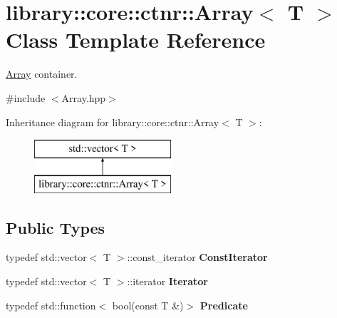\hypertarget{classlibrary_1_1core_1_1ctnr_1_1_array}{}\section{library\+:\+:core\+:\+:ctnr\+:\+:Array$<$ T $>$ Class Template Reference}
\label{classlibrary_1_1core_1_1ctnr_1_1_array}


\hyperlink{classlibrary_1_1core_1_1ctnr_1_1_array}{Array} container.  




{\ttfamily \#include $<$Array.\+hpp$>$}

Inheritance diagram for library\+:\+:core\+:\+:ctnr\+:\+:Array$<$ T $>$\+:\begin{figure}[H]
\begin{center}
\leavevmode
\includegraphics[height=2.000000cm]{classlibrary_1_1core_1_1ctnr_1_1_array}
\end{center}
\end{figure}
\subsection*{Public Types}
\begin{DoxyCompactItemize}
\item 
\mbox{\label{classlibrary_1_1core_1_1ctnr_1_1_array_ac26454f2a2ad4013873386a70aa25fc4}} 
typedef std\+::vector$<$ T $>$\+::const\+\_\+iterator {\bfseries Const\+Iterator}
\item 
\mbox{\label{classlibrary_1_1core_1_1ctnr_1_1_array_a2364a34e7bc76d3661c3d89c4729a0e4}} 
typedef std\+::vector$<$ T $>$\+::iterator {\bfseries Iterator}
\item 
\mbox{\label{classlibrary_1_1core_1_1ctnr_1_1_array_a74cd325a740870aea490b6b739aa06ae}} 
typedef std\+::function$<$ bool(const T \&)$>$ {\bfseries Predicate}
\end{DoxyCompactItemize}

